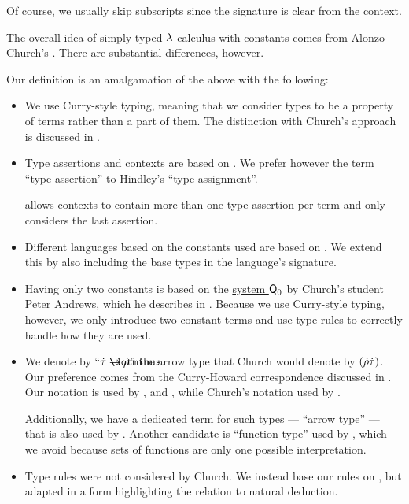 \begin{comments}
  \item Of course, we usually skip subscripts since the signature is clear from the context.

  \item The overall idea of simply typed \( \mathrm{\lambda} \)-calculus with constants comes from Alonzo Church's \cite{Church1940STT}. There are substantial differences, however.

  Our definition is an amalgamation of the above with the following:
  \begin{itemize}
    \item We use Curry-style typing, meaning that we consider types to be a property of terms rather than a part of them. The distinction with Church's approach is discussed in .

    \item Type assertions and contexts are based on \cite[def. 2A4]{Hindley1997STT}. We prefer however the term \enquote{type assertion} to Hindley's \enquote{type assignment}.

     allows contexts to contain more than one type assertion per term and only considers the last assertion.

    \item Different languages based on the constants used are based on \cite[5]{Farmer2008STTVirtues}. We extend this by also including the base types in the language's signature.

    \item Having only two constants is based on the \hyperref[rem:named_logical_systems/q0]{system \( \textsf{Q}_0 \)} by Church's student Peter Andrews, which he describes in \cite[\S 51]{Andrews2002STT}. Because we use Curry-style typing, however, we only introduce two constant terms and use type rules to correctly handle how they are used.

    \item We denote by \enquote{\( \syn\tau \synimplies \syn\rho \)} the arrow type that Church would denote by \( (\dot{\rho}\dot{\tau}) \). Our preference comes from the Curry-Howard correspondence discussed in . Our notation is used by ,  and , while Church's notation used by .

    Additionally, we have a dedicated term for such types --- \enquote{arrow type} --- that is also used by . Another candidate is \enquote{function type} used by , which we avoid because sets of functions are only one possible interpretation.

    \item Type rules were not considered by Church. We instead base our rules on \cite[\S 4.4.1]{Mimram2020Types}, but adapted in a form highlighting the relation to natural deduction.
  \end{itemize}
\end{comments}

